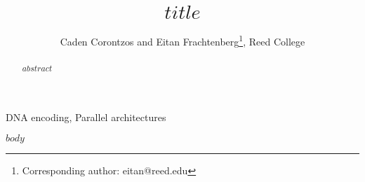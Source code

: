 \documentclass[lettersize,journal,9pt]{IEEEtran}
\begin{document}
\title{$title$}

\author{Caden Corontzos and Eitan Frachtenberg\thanks{Corresponding author: eitan@reed.edu}, Reed College}


\maketitle

\begin{abstract}
$abstract$
\end{abstract}

\begin{IEEEkeywords}
  DNA encoding, Parallel architectures
\end{IEEEkeywords}

$body$




\end{document}
